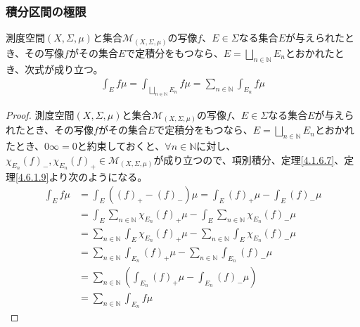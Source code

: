 \documentclass[dvipdfmx]{jsarticle}
\begin{document}
\subsubsection{積分区間の極限}%
\begin{thm}\label{4.6.2.12}
測度空間$(X,\varSigma,\mu)$と集合$\mathcal{M}_{(X,\varSigma,\mu)}$の写像$f$、$E \in \varSigma$なる集合$E$が与えられたとき、その写像$f$がその集合$E$で定積分をもつなら、$E = \bigsqcup_{n \in \mathbb{N}} E_{n}$とおかれたとき、次式が成り立つ。
\begin{align*}
\int_{E} {f\mu} = \int_{\bigsqcup_{n \in \mathbb{N}} E_{n}} {f\mu} = \sum_{n \in \mathbb{N}} {\int_{E_{n}} {f\mu}}
\end{align*}
\end{thm}
\begin{proof}
測度空間$(X,\varSigma,\mu)$と集合$\mathcal{M}_{(X,\varSigma,\mu)}$の写像$f$、$E \in \varSigma$なる集合$E$が与えられたとき、その写像$f$がその集合$E$で定積分をもつなら、$E = \bigsqcup_{n \in \mathbb{N}} E_{n}$とおかれたとき、$0\infty = 0$と約束しておくと、$\forall n \in \mathbb{N}$に対し、$\chi_{E_{n}}(f)_{-},\chi_{E_{n}}(f)_{+} \in \mathcal{M}_{(X,\varSigma,\mu)}$が成り立つので、項別積分、定理\ref{4.1.6.7}、定理\ref{4.6.1.9}より次のようになる。
\begin{align*}
\int_{E} {f\mu} &= \int_{E} {\left( (f)_{+} - (f)_{-} \right)\mu} = \int_{E} {(f)_{+}\mu} - \int_{E} {(f)_{-}\mu}\\
&= \int_{E} {\sum_{n \in \mathbb{N}} {\chi_{E_{n}}(f)_{+}}\mu} - \int_{E} {\sum_{n \in \mathbb{N}} {\chi_{E_{n}}(f)_{-}}\mu}\\
&= \sum_{n \in \mathbb{N}} {\int_{E} {\chi_{E_{n}}(f)_{+}\mu}} - \sum_{n \in \mathbb{N}} {\int_{E} {\chi_{E_{n}}(f)_{-}\mu}}\\
&= \sum_{n \in \mathbb{N}} {\int_{E_{n}} {(f)_{+}\mu}} - \sum_{n \in \mathbb{N}} {\int_{E_{n}} {(f)_{-}\mu}}\\
&= \sum_{n \in \mathbb{N}} \left( \int_{E_{n}} {(f)_{+}\mu} - \int_{E_{n}} {(f)_{-}\mu} \right)\\
&= \sum_{n \in \mathbb{N}} {\int_{E_{n}} {f\mu}}
\end{align*}
\end{proof}
\end{document}
